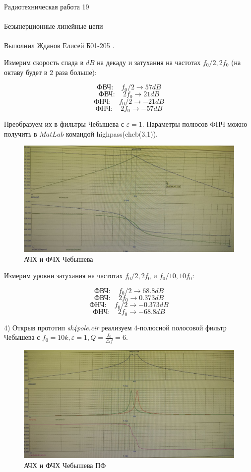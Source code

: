 \documentclass{astroedu-lab}
\begin{document}
\begin{problem}{\huge Радиотехническая работа 19\\\\Безынерционные линейные цепи\\\\Выполнил Жданов Елисей Б01-205}
.

Измерим скорость спада в $dB$ на декаду и затухания на частотах $f_0 / 2, 2f_0$ (на октаву будет в 2 раза больше):

\[\textit{ФВЧ}: \quad f_0 / 2 \rightarrow 57 dB\]
\[\textit{ФВЧ}: \quad 2f_0 \rightarrow 21 dB\]
\[\textit{ФНЧ}: \quad f_0 / 2 \rightarrow -21 dB\]
\[\textit{ФНЧ}: \quad 2f_0 \rightarrow -57 dB\]

Преобразуем их в фильтры Чебышева с $\varepsilon = 1$. Параметры полюсов ФНЧ можно получить в $MatLab$ командой highpass(cheb(3,1)).


\begin{figure}[!h]
	\centering
	\includegraphics[width=1.0\textwidth]{cheb1.jpg}
	\caption{АЧХ и ФЧХ Чебышева}
	\label{fig:boiler}
\end{figure}


Измерим уровни затухания на частотах $f_0 / 2, 2f_0$ и $f_0 / 10, 10f_0$:

\[\textit{ФВЧ}: \quad f_0 / 2 \rightarrow 68.8 dB\]
\[\textit{ФВЧ}: \quad 2f_0 \rightarrow 0.373 dB\]
\[\textit{ФНЧ}: \quad f_0 / 2 \rightarrow -0.373 dB\]
\[\textit{ФНЧ}: \quad 2f_0 \rightarrow -68.8 dB\]

\newpage

4) Открыв прототип \textit{sk4pole.cir} реализуем 4-полюсной полосовой фильтр Чебышева с $f_0 = 10k, \varepsilon = 1, Q = \frac{f_0}{\bigtriangleup f} = 6$.

\begin{figure}[!h]
	\centering
	\includegraphics[width=1.0\textwidth]{cheb2.jpg}
	\caption{АЧХ и ФЧХ Чебышева ПФ}
	\label{fig:boiler}
\end{figure}


\end{problem}
\end{document}
